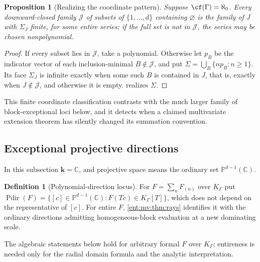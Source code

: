 \documentclass[11pt]{article}
\theoremstyle{plain}
\theoremstyle{plain}
\newtheorem{proposition}[proposition]{Proposition}
\theoremstyle{plain}
\theoremstyle{definition}
\newtheorem{definition}[definition]{Definition}
\theoremstyle{definition}
\theoremstyle{definition}
\theoremstyle{definition}
\theoremstyle{remark}
\newcommand{\C}{\mathbb C}\newcommand{\R}{\mathbb R}
\newcommand{\K}{K_\Gamma}\newcommand{\KD}{K_\Delta}
\newcommand{\kk}{\mathbf k}\newcommand{\PP}{\mathbb P}
\DeclareMathOperator{\Pdir}{Pdir}\DeclareMathOperator{\Adm}{Adm}
\begin{document}
\begin{proposition}[Realizing the coordinate pattern]
\label{ent:mv:prop:coordinate-realize}
Suppose $\cf(\Gamma)=\aleph_0$. Every downward-closed family $\mathcal J$ of
subsets of $\{1,\ldots,d\}$ containing $\varnothing$ is the family of $J$
with $\Sigma_J$ finite, for some entire series; if the full set is not in
$\mathcal J$, the series may be chosen nonpolynomial.
\end{proposition}
\begin{proof}
If every subset lies in $\mathcal J$, take a polynomial. Otherwise let $p_B$
be the indicator vector of each inclusion-minimal $B\notin\mathcal J$, and put
$\Sigma=\bigcup_B\{np_B:n\ge1\}$. Its face $\Sigma_J$ is infinite exactly when
some such $B$ is contained in $J$, that is, exactly when $J\notin\mathcal J$,
and otherwise it is empty.  realizes
$\Sigma$.
\end{proof}

This finite coordinate classification contrasts with the much larger family
of block-exceptional loci below, and it detects when a claimed multivariate
extension theorem has silently changed its summation convention.

\subsection{Exceptional projective directions}
\label{ent:mv:subsec:exceptional}
In this subsection $\kk=\C$, and projective space means the ordinary set
$\PP^{d-1}(\C)$.

\begin{definition}[Polynomial-direction locus]\label{ent:mv:def:pdir}
For $F=\sum_nF_{(n)}$ over $\K$ put
$\Pdir(F)=\{[c]\in\PP^{d-1}(\C):F(Tc)\in\K[T]\}$, which does not depend on
the representative of $[c]$. For entire $F$, \cref{ent:mv:thm:rays}
identifies it with the ordinary directions admitting homogeneous-block
evaluation at a new dominating scale.
\end{definition}

The algebraic statements below hold for arbitrary formal $F$ over $\K$;
entireness is needed only for the radial domain formula and the analytic
interpretation.
\end{document}
